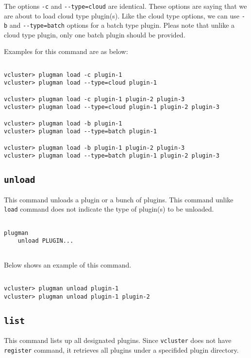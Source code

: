 \documentclass[11pt]{article}
\def \ttt{\texttt}
\def \vb{\verb}
\begin{document}
The options \vb+-c+ and \vb+--type=cloud+ are identical. These options are saying that we are about to load cloud type plugin(s). Like the cloud type options, we can use \vb+-b+ and \vb+--type=batch+ options for a batch type plugin. Pleas note that unlike a cloud type plugin, only one batch plugin should be provided.

Examples for this command are as below:


\begin{Verbatim}[fontfamily=courier, fontsize = \small, obeytabs
=true, tabsize=4, frame=lines]

vcluster> plugman load -c plugin-1
vcluster> plugman load --type=cloud plugin-1

vcluster> plugman load -c plugin-1 plugin-2 plugin-3
vcluster> plugman load --type=cloud plugin-1 plugin-2 plugin-3

vcluster> plugman load -b plugin-1
vcluster> plugman load --type=batch plugin-1

vcluster> plugman load -b plugin-1 plugin-2 plugin-3
vcluster> plugman load --type=batch plugin-1 plugin-2 plugin-3

\end{Verbatim}



\subsection{\ttt{unload}}
This command unloads a plugin or a bunch of plugins. This command unlike \vb+load+ command does not indicate the type of plugin(s) to be unloaded.

\begin{Verbatim}[fontfamily=courier, fontsize = \small, obeytabs
=true, tabsize=4, frame=lines]

plugman 
    unload PLUGIN...
      
\end{Verbatim}

Below shows an example of this command.

\begin{Verbatim}[fontfamily=courier, fontsize = \small, obeytabs
=true, tabsize=4, frame=lines]

vcluster> plugman unload plugin-1
vcluster> plugman unload plugin-1 plugin-2

\end{Verbatim}




\subsection{\ttt{list}}
This command lists up all designated plugins. Since \vb+vcluster+ does not have \vb+register+ command, it retrieves all plugins under a specifided plugin directory.
\end{document}
